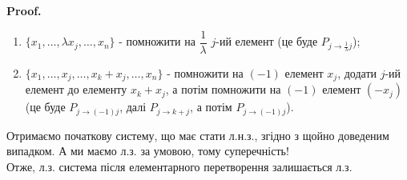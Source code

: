 \documentclass[a4paper, 10pt]{article}
\makeatletter
\theoremstyle{theoremdd}
\renewenvironment{proof}[1][Proof.\\]{\par
\pushQED{\hfill \qed}%
\normalfont \topsep6\p@\@plus6\p@\relax
\trivlist
\item\relax
{\bfseries
#1\@addpunct{.}}\hspace\labelsep\ignorespaces
}{%
\popQED\endtrivlist\@endpefalse
}
\makeatother
\begin{document}
\begin{proof}
\begin{enumerate}[nosep, wide = 0pt, label={\Roman*.}]
	\item $\{x_1, \dots, \lambda x_j, \dots, x_n\}$ - помножити на $\dfrac{1}{\lambda}$ $j$-ий елемент (це буде $P_{j \to \frac{1}{\lambda} j}$);
	\item $\{x_1, \dots, x_j, \dots,  x_k + x_j, \dots, x_n\}$ - помножити на $(-1)$ елемент $x_j$, додати $j$-ий елемент до елементу $x_k+x_j$, а потім помножити на $(-1)$ елемент $(-x_j)$ (це буде $P_{j \to (-1)j}$, далі $P_{j \to k+j}$, а потім $P_{j \to (-1)j}$).
	\end{enumerate}
	Отримаємо початкову систему, що має стати л.н.з., згідно з щойно доведеним випадком. А ми маємо л.з. за умовою, тому суперечність! \\
	Отже, л.з. система після елементарного перетворення залишається л.з.
	\end{proof}
	
\end{document}
